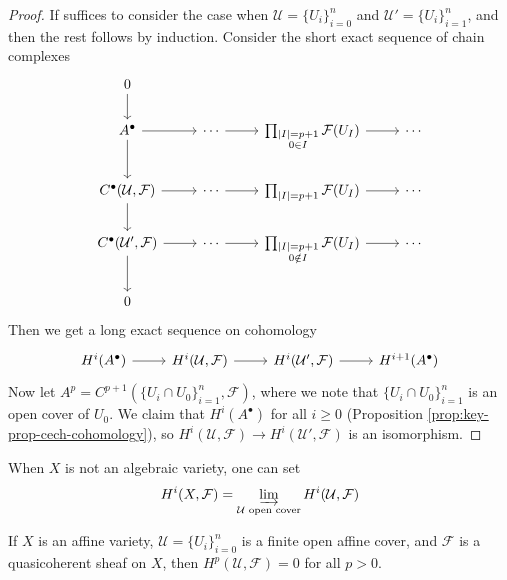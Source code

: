 \begin{proof}
  If suffices to consider the case
  when $\mathcal{U} = \{U_i\}_{i = 0}^n$
  and $\mathcal{U}' = \{U_i\}_{i = 1}^{n}$,
  and then the rest follows by induction.
  Consider the short exact sequence of
  chain complexes
  \[
    \begin{tikzcd}
      0 \ar[d] \\
      A^\bullet \ar[d] \ar[r] & \cdots \ar[r] & \prod_{\substack{|I| = p + 1 \\ 0 \in I}} \mathcal{F}(U_I) \ar[r] & \cdots \\
      C^\bullet(\mathcal{U}, \mathcal{F}) \ar[d] \ar[r] & \cdots \ar[r] & \prod_{|I| = p + 1} \mathcal{F}(U_I) \ar[r] & \cdots \\
      C^\bullet(\mathcal{U}', \mathcal{F}) \ar[d] \ar[r] & \cdots \ar[r] & \prod_{\substack{|I| = p + 1 \\ 0 \notin I}} \mathcal{F}(U_I) \ar[r] & \cdots \\
      0
    \end{tikzcd}
  \]
  Then we get a long exact sequence
  on cohomology
  \[
    \begin{tikzcd}
      H^i(A^\bullet)
      \ar[r] & H^i(\mathcal{U}, \mathcal{F})
      \ar[r] & H^i(\mathcal{U}', \mathcal{F})
      \ar[r] & H^{i + 1}(A^\bullet)
    \end{tikzcd}
  \]
  Now let
  $A^p = C^{p + 1}(\{U_i \cap U_0\}_{i = 1}^n, \mathcal{F})$,
  where we note that
  $\{U_i \cap U_0\}_{i = 1}^n$ is an open
  cover of $U_0$. We claim that
  $H^i(A^\bullet)$ for all $i \ge 0$
  (Proposition \ref{prop:key-prop-cech-cohomology}),
  so $H^i(\mathcal{U}, \mathcal{F}) \to H^i(\mathcal{U}', \mathcal{F})$
  is an isomorphism.
\end{proof}

\begin{remark}
  When $X$ is not an algebraic variety, one
  can set
  \[
    H^i(X, \mathcal{F})
    = \varinjlim_{\mathcal{U} \text{ open cover}} H^i(\mathcal{U}, \mathcal{F})
  \]
\end{remark}

\begin{prop}\label{prop:key-prop-cech-cohomology}
  If $X$ is an affine variety,
  $\mathcal{U} = \{U_i\}_{i = 0}^n$ is a
  finite open affine cover, and
  $\mathcal{F}$ is a quasicoherent sheaf
  on $X$, then
  $H^p(\mathcal{U}, \mathcal{F}) = 0$
  for all $p > 0$.
\end{prop}

